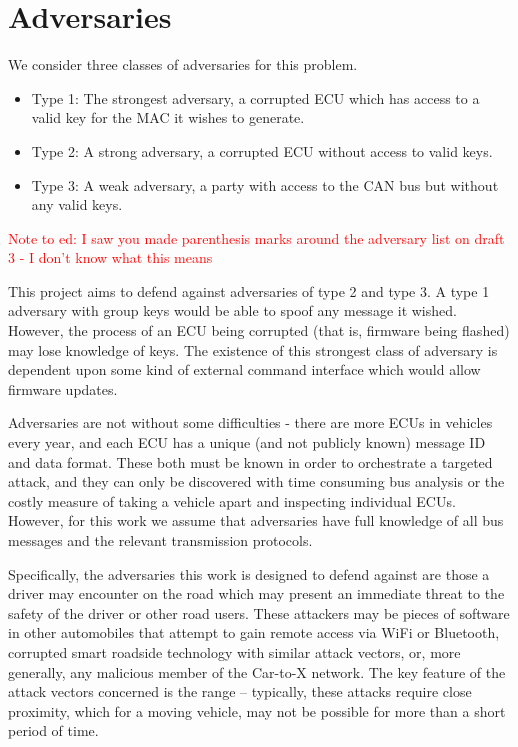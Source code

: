 \section{Adversaries}
We consider three classes of adversaries for this problem.

\begin{itemize}
	\item Type 1: The strongest adversary, a corrupted ECU which has access to a valid key for the MAC it wishes to generate.
	\item Type 2: A strong adversary, a corrupted ECU without access to valid keys.
	\item Type 3: A weak adversary, a party with access to the CAN bus but without any valid keys.
\end{itemize}

\textcolor{red}{Note to ed: I saw you made parenthesis marks around the adversary list on draft 3 - I don't know what this means}

This project aims to defend against adversaries of type 2 and type 3. A type 1 adversary with group keys would be able to spoof any message it wished. However, the process of an ECU being corrupted (that is, firmware being flashed) may lose knowledge of keys. The existence of this strongest class of adversary is dependent upon some kind of external command interface which would allow firmware updates.

Adversaries are not without some difficulties - there are more ECUs in vehicles every year, and each ECU has a unique (and not publicly known) message ID and data format. These both must be known in order to orchestrate a targeted attack, and they can only be discovered with time consuming bus analysis or the costly measure of taking a vehicle apart and inspecting individual ECUs. However, for this work we assume that adversaries have full knowledge of all bus messages and the relevant transmission protocols.

Specifically, the adversaries this work is designed to defend against are those a driver may encounter on the road which may present an immediate threat to the safety of the driver or other road users. These attackers may be pieces of software in other automobiles that attempt to gain remote access via WiFi or Bluetooth, corrupted smart roadside technology with similar attack vectors, or, more generally, any malicious member of the Car-to-X network. The key feature of the attack vectors concerned is the range -- typically, these attacks require close proximity, which for a moving vehicle, may not be possible for more than a short period of time. 

